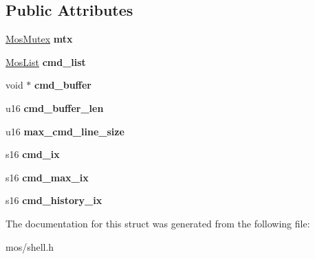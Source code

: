 \subsection*{Public Attributes}
\begin{DoxyCompactItemize}
\item 
\mbox{\label{structMosShell_ad385f409dd88d2c56c2cd7c863abfb18}} 
\hyperlink{structMosMutex}{Mos\+Mutex} {\bfseries mtx}
\item 
\mbox{\label{structMosShell_aceed2ca93728f39150d2820a3ac12917}} 
\hyperlink{structMosList}{Mos\+List} {\bfseries cmd\+\_\+list}
\item 
\mbox{\label{structMosShell_a2322b8c62140118c8c5a1a85a010bc72}} 
void $\ast$ {\bfseries cmd\+\_\+buffer}
\item 
\mbox{\label{structMosShell_a4e4095bd92770fa71bcb9e87f01b7ed5}} 
u16 {\bfseries cmd\+\_\+buffer\+\_\+len}
\item 
\mbox{\label{structMosShell_a35ea35dd5fffae9e530af96a0d7d8950}} 
u16 {\bfseries max\+\_\+cmd\+\_\+line\+\_\+size}
\item 
\mbox{\label{structMosShell_abdb8f7af3edea29d0f85c1d58112d15d}} 
s16 {\bfseries cmd\+\_\+ix}
\item 
\mbox{\label{structMosShell_aa654a50a58c707908f7ac9424f9d4844}} 
s16 {\bfseries cmd\+\_\+max\+\_\+ix}
\item 
\mbox{\label{structMosShell_ad6cd893593123bf76aa51863c28ae39a}} 
s16 {\bfseries cmd\+\_\+history\+\_\+ix}
\end{DoxyCompactItemize}


The documentation for this struct was generated from the following file\+:\begin{DoxyCompactItemize}
\item 
mos/shell.\+h\end{DoxyCompactItemize}
